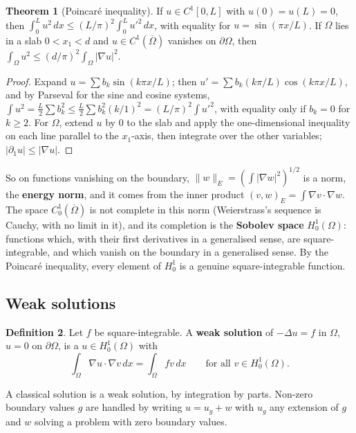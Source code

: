 \documentclass[11pt,a4paper]{article}
\numberwithin{equation}{section}
\theoremstyle{definition}
\newtheorem{thm}{Theorem}[subsection]
\newtheorem{defn}[thm]{Definition}
\begin{document}
\begin{thm}[Poincar\'e inequality]
\label{thm:poincare}
If $u \in C^1[0, L]$ with $u(0) = u(L) = 0$, then $\int_0^Lu^2\,dx \leq (L/\pi)^2\int_0^Lu'^2\,dx$, with equality for $u = \sin(\pi x/L)$. If $\Omega$ lies in a slab $0 < x_1 < d$ and $u \in C^1(\overline\Omega)$ vanishes on $\partial\Omega$, then $\int_\Omega u^2 \leq (d/\pi)^2\int_\Omega|\nabla u|^2$.
\end{thm}

\begin{proof}
Expand $u = \sum b_k\sin(k\pi x/L)$; then $u' = \sum b_k(k\pi/L)\cos(k\pi x/L)$, and by Parseval for the sine and cosine systems, $\int u^2 = \frac L2\sum b_k^2 \leq \frac L2\sum b_k^2(k/1)^2 = (L/\pi)^2\int u'^2$, with equality only if $b_k = 0$ for $k \geq 2$. For $\Omega$, extend $u$ by $0$ to the slab and
apply the one-dimensional inequality on each line parallel to the $x_1$-axis, then integrate over the other variables; $|\partial_1u| \leq |\nabla u|$.
\end{proof}

So on functions vanishing on the boundary, $\|w\|_E = (\int|\nabla w|^2)^{1/2}$ is a norm, the \textbf{energy norm}, and it comes from the inner product $(v, w)_E = \int\nabla v\cdot\nabla w$. The space $C^1_0(\overline\Omega)$ is not complete in this norm (Weierstrass's sequence is Cauchy, with no limit in it), and its
completion is the \textbf{Sobolev space} $H^1_0(\Omega)$: functions which, with their first derivatives in a generalised sense, are square-integrable, and which vanish on the boundary in a generalised sense. By the Poincar\'e inequality, every element of $H^1_0$ is a genuine square-integrable function.

\subsection{Weak solutions}
\label{ssec:weaksolutions}

\begin{defn}
Let $f$ be square-integrable. A \textbf{weak solution} of $-\Delta u = f$ in $\Omega$, $u = 0$ on $\partial\Omega$, is a $u \in H^1_0(\Omega)$ with
\[
\int_\Omega\nabla u\cdot\nabla v\,dx = \int_\Omega fv\,dx \qquad\text{for all } v \in H^1_0(\Omega) .
\]
\end{defn}

A classical solution is a weak solution, by integration by parts. Non-zero boundary values $g$ are handled by writing $u = u_g + w$ with $u_g$ any extension of $g$ and $w$ solving a problem with zero boundary values.
\end{document}
